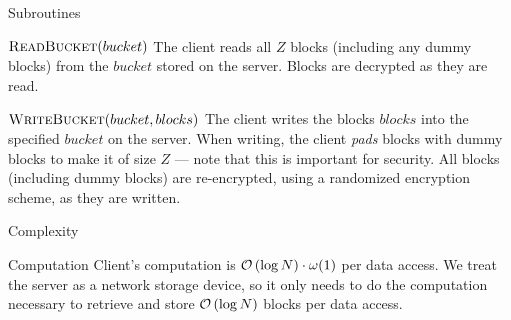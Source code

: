 \begin{frame}{Subroutines}
	
	\begin{block}{$\textsc{ReadBucket}(bucket)$}
		The client reads all $Z$ blocks (including any dummy blocks) from the $bucket$ stored on the server. 
		Blocks are decrypted as they are read.
	\end{block} 

	\begin{block}{$\textsc{WriteBucket}(bucket, blocks)$}
		The client writes the blocks $blocks$ into the specified $bucket$ on the server. 
		When writing, the client \emph{pads} blocks with dummy blocks to make it of size $Z$ --- note that this is important for security. 
		All blocks (including dummy blocks) are re-encrypted, using a randomized encryption scheme, as they are written.
	\end{block} 

\end{frame}

		\begin{frame}{Complexity}
			
			\begin{block}{Computation}
				Client's computation is $\mathcal{O}\left(\log N\right) \cdot \omega (1)$ per data access. 
				We treat the server as a network storage device, so it only needs to do the computation necessary to retrieve and store $\mathcal{O}\left(\log N\right)$ blocks per data access.
			\end{block} 

		\end{frame}

